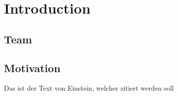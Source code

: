 \Author{\daAuthorOne}  %

\section{Introduction}

\subsection{Team}

\subsection{Motivation}

Das ist der Text von Einstein, welcher zitiert werden soll \autocite{einstein}

